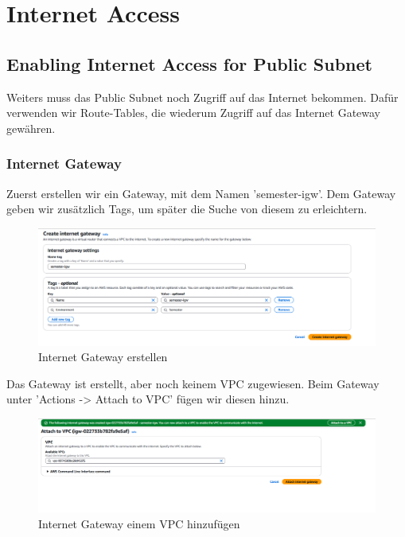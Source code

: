 \documentclass[a4paper,12pt]{article}
\begin{document}
\section{Internet Access}
\subsection{Enabling Internet Access for Public Subnet}
Weiters muss das Public Subnet noch Zugriff auf das Internet bekommen.
Dafür verwenden wir Route-Tables, die wiederum Zugriff auf das Internet Gateway gewähren.

\subsubsection{Internet Gateway}
Zuerst erstellen wir ein Gateway, mit dem Namen 'semester-igw'. 
Dem Gateway geben wir zusätzlich Tags, um später die Suche von diesem zu erleichtern.

\begin{figure}[h!]
	\centering
	\includegraphics[width=\textwidth]{data/Create_IGW.png}
	\caption{Internet Gateway erstellen}
	\label{fig:Internet Gateway}
\end{figure}

Das Gateway ist erstellt, aber noch keinem VPC zugewiesen. 
Beim Gateway unter 'Actions -> Attach to VPC' fügen wir diesen hinzu.

\begin{figure}[h!]
	\centering
	\includegraphics[width=\textwidth]{data/Attach_IGW.png}
	\caption{Internet Gateway einem VPC hinzufügen}
	\label{fig:Attach Internet Gateway}
\end{figure}
\end{document}
